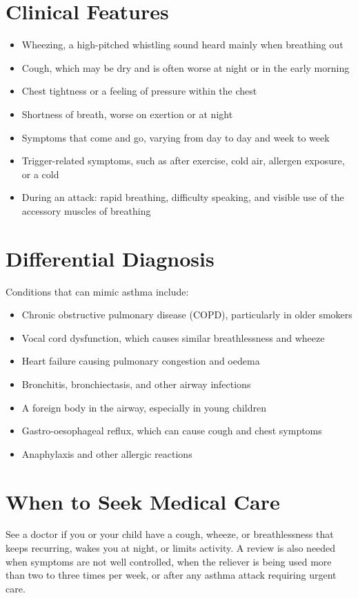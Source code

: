 \section*{Clinical Features}
\begin{itemize}
    \item Wheezing, a high-pitched whistling sound heard mainly when breathing out
    \item Cough, which may be dry and is often worse at night or in the early morning
    \item Chest tightness or a feeling of pressure within the chest
    \item Shortness of breath, worse on exertion or at night
    \item Symptoms that come and go, varying from day to day and week to week
    \item Trigger-related symptoms, such as after exercise, cold air, allergen exposure, or a cold
    \item During an attack: rapid breathing, difficulty speaking, and visible use of the accessory muscles of breathing
\end{itemize}

\section*{Differential Diagnosis}
Conditions that can mimic asthma include:
\begin{itemize}
    \item Chronic obstructive pulmonary disease (COPD), particularly in older smokers
    \item Vocal cord dysfunction, which causes similar breathlessness and wheeze
    \item Heart failure causing pulmonary congestion and oedema
    \item Bronchitis, bronchiectasis, and other airway infections
    \item A foreign body in the airway, especially in young children
    \item Gastro-oesophageal reflux, which can cause cough and chest symptoms
    \item Anaphylaxis and other allergic reactions
\end{itemize}

\section*{When to Seek Medical Care}
See a doctor if you or your child have a cough, wheeze, or breathlessness that keeps recurring, wakes you at night, or limits activity. A review is also needed when symptoms are not well controlled, when the reliever is being used more than two to three times per week, or after any asthma attack requiring urgent care.

